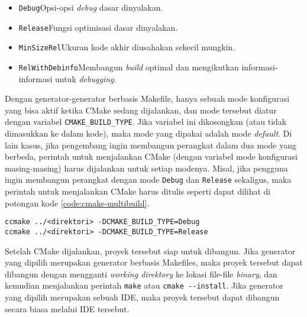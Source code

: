 \begin{enumerate}
\begin{itemize}
		\begin{itemize}
			\item \verb|Debug|\textemdash Opsi-opsi \textit{debug} dasar dinyalakan.
			\item \verb|Release|\textemdash Fungsi optimisasi dasar dinyalakan.
			\item \verb|MinSizeRel|\textemdash Ukuran kode akhir diusahakan sekecil mungkin.
			\item \verb|RelWithDebinfo|\textemdash Membangun \textit{build} optimal dan mengikutkan informasi-informasi untuk \textit{debugging}.
		\end{itemize}
		
		Dengan generator-generator berbasis Makefile, hanya sebuah mode konfigurasi yang bisa aktif ketika CMake sedang dijalankan, dan mode tersebut diatur dengan variabel \verb|CMAKE_BUILD_TYPE|. Jika variabel ini dikosongkan (atau tidak dimasukkan ke dalam kode), maka mode yang dipakai adalah mode \textit{default}. Di lain kasus, jika pengembang ingin membangun perangkat dalam dua mode yang berbeda, perintah untuk menjalankan CMake (dengan variabel mode konfigurasi masing-masing) harus dijalankan untuk setiap modenya. 
		Misal, jika pengguna ingin membangun perangkat dengan mode \verb|Debug| dan \verb|Release| sekaligus, maka perintah untuk menjalankan CMake harus ditulis seperti dapat dilihat di potongan kode \ref{code:cmake-multibuild}.
		\newpage %
		\begin{lstlisting}[caption=Contoh kode pembangunan CMake lebih dari satu mode, label=code:cmake-multibuild]
ccmake ../<direktori> -DCMAKE_BUILD_TYPE=Debug
ccmake ../<direktori> -DCMAKE_BUILD_TYPE=Release
		\end{lstlisting}
		
	\end{itemize}
	
	Setelah CMake dijalankan, proyek tersebut siap untuk dibangun. Jika generator yang dipilih merupakan generator berbasis Makefiles, maka proyek tersebut dapat dibangun dengan mengganti \textit{working direktory} ke lokasi file-file \textit{binary}, dan kemudian menjalankan perintah \verb|make| atau \verb|cmake --install|. Jika generator yang dipilih merupakan sebuah IDE, maka proyek tersebut dapat dibangun secara biasa melalui IDE tersebut.
\end{enumerate}